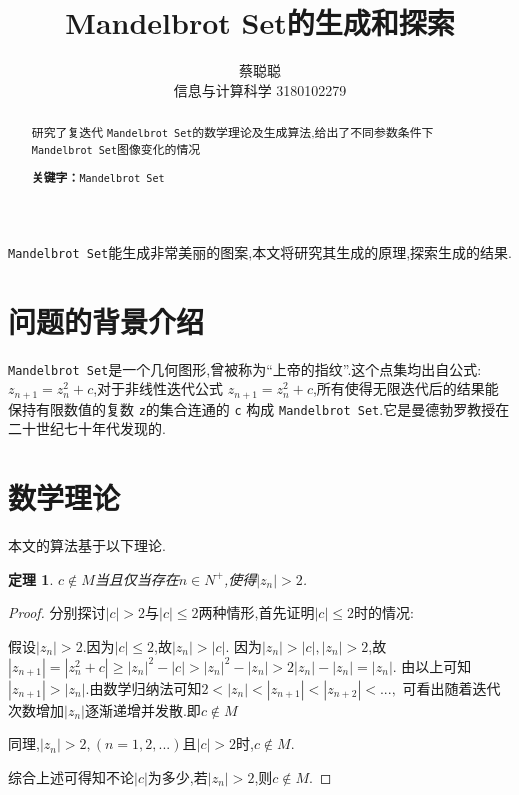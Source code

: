 \documentclass[a4paper]{ctexart}
\title{Mandelbrot Set的生成和探索}
\author{蔡聪聪\\信息与计算科学 3180102279}
\date{}
\begin{document}
\maketitle

\begin{abstract}
 研究了复迭代 \verb|Mandelbrot Set|的数学理论及生成算法,给出了不同参数条件下 \verb|Mandelbrot Set|图像变化的情况\par
\textbf{关键字：}\verb|Mandelbrot Set|
\end{abstract}


\verb|Mandelbrot Set|能生成非常美丽的图案,本文将研究其生成的原理,探索生成的结果.
\section{问题的背景介绍}
\verb|Mandelbrot Set|是一个几何图形,曾被称为“上帝的指纹”.这个点集均出自公式: $z_{n+1}=z_n^2+c$,对于非线性迭代公式 $z_{n+1}=z_n^2+c$,所有使得无限迭代后的结果能保持有限数值的复数 \verb|z|的集合连通的 \verb|c| 构成 \verb|Mandelbrot Set|.\cite{ztr2013hd}它是曼德勃罗教授在二十世纪七十年代发现的.
\section{数学理论}
本文的算法基于以下理论.
\newtheorem{lemma}{定理}
\begin{lemma}
  $c \notin M$当且仅当存在$n \in N^+$,使得$|z_n|>2$.
\end{lemma}

\begin{proof}
分别探讨$|c|>2$与$|c|\leq 2$两种情形,首先证明$|c| \leq 2$时的情况:\par
假设$|z_n|>2$.因为$|c| \leq 2$,故$|z_n|>|c|$.
因为$|z_n|>|c|,|z_n|>2$,故$|z_{n+1}|=|z_n^2+c|\geq|z_n|^2-|c|>|z_n|^2-|z_n|>2|z_n|-|z_n|=|z_n|$.
由以上可知$|z_{n+1}|>|z_n|$.由数学归纳法可知$2<|{z_n}|<|z_{n+1}|<|z_{n+2}|<...,$ 可看出随着迭代次数增加$|z_n|$逐渐递增并发散.即$c\notin M$\par
同理,$|z_{n}|>2,(n=1,2,...)$且$|c|>2$时,$c\notin M$.\par
综合上述可得知不论$|c|$为多少,若$|z_n|>2$,则$c\notin M$.
\end{proof}
\end{document}
